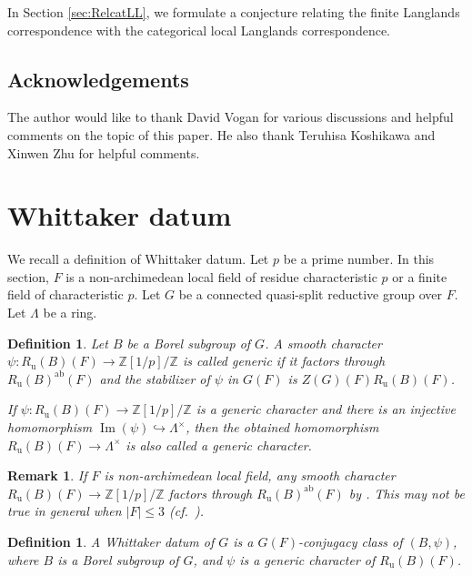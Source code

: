 \documentclass[12pt,a4paper]{article}
\newtheorem{defn}[thm]{Definition}
\newtheorem{rem}[thm]{Remark}
\DeclareMathOperator{\Image}{Im}
\newcommand{\cf}{\textit{cf.\ }}
\newcommand{\mb}{\mathbb}
\newcommand{\mr}{\mathrm}
\newcommand{\ol}{\overline}
\newcommand{\ab}{\mathrm{ab}}
\begin{document}
In Section \ref{sec:RelcatLL}, we formulate a conjecture relating the finite Langlands correspondence with the categorical local Langlands correspondence. 

\subsection*{Acknowledgements}
The author would like to thank David Vogan for various discussions and helpful comments on the topic of this paper. 
He also thank Teruhisa Koshikawa and Xinwen Zhu for helpful comments. 
\section{Whittaker datum}

We recall a definition of Whittaker datum. 
Let $p$ be a prime number. 
In this section, 
$F$ is a non-archimedean local field of residue characteristic $p$ or a finite field of characteristic $p$. 
Let $G$ be a connected quasi-split reductive group over $F$. 
Let $\Lambda$ be a ring. 

\begin{defn}
Let $B$ be a Borel subgroup of $G$. 
A smooth character $\psi \colon R_{\mr{u}}(B)(F) \to \mb{Z}[1/p]/\mb{Z}$ is called generic if it factors through $R_{\mr{u}}(B)^{\ab}(F)$ and the stabilizer of $\psi$ in $G(F)$ is $Z(G)(F)R_{\mr{u}}(B)(F)$. 

If $\psi \colon R_{\mr{u}}(B)(F) \to \mb{Z}[1/p]/\mb{Z}$ is a generic character and there is an injective homomorphism $\Image (\psi) \hookrightarrow \Lambda^{\times}$, then the obtained homomorphism  $R_{\mr{u}}(B)(F) \to \Lambda^{\times}$ is also called a generic character. 
\end{defn}

\begin{rem}
If $F$ is non-archimedean local field, any smooth character $R_{\mr{u}}(B)(F) \to \mb{Z}[1/p]/\mb{Z}$ factors through $R_{\mr{u}}(B)^{\ab}(F)$ by \cite[4.1 Theorem]{BuHeOnderunip}. 
This may not be true in general when $\lvert F \rvert \leq 3$ (\cf \cite[Lemma 7]{HowdegSt}). 
\end{rem}

\begin{defn}
	A Whittaker datum of $G$ is a $G(F)$-conjugacy class of $(B,\psi)$, where 
	$B$ is a Borel subgroup of $G$, and $\psi$ is a generic character of $R_{\mr{u}}(B)(F)$. 
\end{defn}
\end{document}
